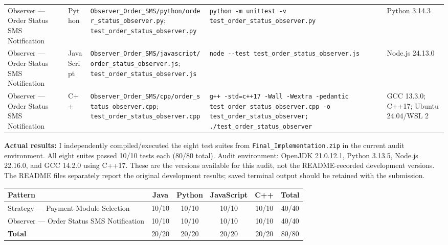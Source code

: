 \documentclass[11pt,a4paper]{article}
\newcommand{\tsmall}{\small\setlength{\tabcolsep}{3pt}}
\begin{document}
\begin{longtable}{@{}P{1.9cm}P{1.5cm}P{4.4cm}P{5.6cm}P{2.6cm}@{}}
Observer --- Order Status SMS Notification & Python & \texttt{Observer\_\allowbreak{}Order\_\allowbreak{}SMS/\allowbreak{}python/\allowbreak{}order\_\allowbreak{}status\_\allowbreak{}observer.\allowbreak{}py}; \texttt{test\_\allowbreak{}order\_\allowbreak{}status\_\allowbreak{}observer.\allowbreak{}py} & \texttt{python -\allowbreak{}m unittest -\allowbreak{}v test\_\allowbreak{}order\_\allowbreak{}status\_\allowbreak{}observer.\allowbreak{}py} & Python 3.14.3\\
Observer --- Order Status SMS Notification & JavaScript & \texttt{Observer\_\allowbreak{}Order\_\allowbreak{}SMS/\allowbreak{}javascript/\allowbreak{}order\_\allowbreak{}status\_\allowbreak{}observer.\allowbreak{}js}; \texttt{test\_\allowbreak{}order\_\allowbreak{}status\_\allowbreak{}observer.\allowbreak{}js} & \texttt{node -\allowbreak{}-\allowbreak{}test test\_\allowbreak{}order\_\allowbreak{}status\_\allowbreak{}observer.\allowbreak{}js} & Node.js 24.13.0\\
Observer --- Order Status SMS Notification & C++ & \texttt{Observer\_\allowbreak{}Order\_\allowbreak{}SMS/\allowbreak{}cpp/\allowbreak{}order\_\allowbreak{}status\_\allowbreak{}observer.\allowbreak{}cpp}; \texttt{test\_\allowbreak{}order\_\allowbreak{}status\_\allowbreak{}observer.\allowbreak{}cpp} & \texttt{g++ -\allowbreak{}std=c++17 -\allowbreak{}Wall -\allowbreak{}Wextra -\allowbreak{}pedantic test\_\allowbreak{}order\_\allowbreak{}status\_\allowbreak{}observer.\allowbreak{}cpp -\allowbreak{}o test\_\allowbreak{}order\_\allowbreak{}status\_\allowbreak{}observer; .\allowbreak{}/\allowbreak{}test\_\allowbreak{}order\_\allowbreak{}status\_\allowbreak{}observer} & GCC 13.3.0; C++17; Ubuntu 24.04/WSL 2\\
\bottomrule
\end{longtable}
\endgroup

\textbf{Actual results:} I independently compiled/executed the eight test suites from \texttt{Final\_\allowbreak{}Implementation.\allowbreak{}zip} in the current audit environment. All eight suites passed 10/10 tests each (80/80 total). Audit environment: OpenJDK 21.0.12.1, Python 3.13.5, Node.js 22.16.0, and GCC 14.2.0 using C++17. These are the versions available for this audit, not the README-recorded development versions. The README files separately report the original development results; saved terminal output should be retained with the submission.

\begin{center}
\tsmall
\begin{tabular}{@{}lccccc@{}}
\toprule
\textbf{Pattern} & \textbf{Java} & \textbf{Python} & \textbf{JavaScript} & \textbf{C++} & \textbf{Total}\\
\midrule
Strategy --- Payment Module Selection & 10/10 & 10/10 & 10/10 & 10/10 & 40/40\\
Observer --- Order Status SMS Notification & 10/10 & 10/10 & 10/10 & 10/10 & 40/40\\
\midrule
\textbf{Total} & 20/20 & 20/20 & 20/20 & 20/20 & 80/80\\
\bottomrule
\end{tabular}
\end{center}
\end{document}
